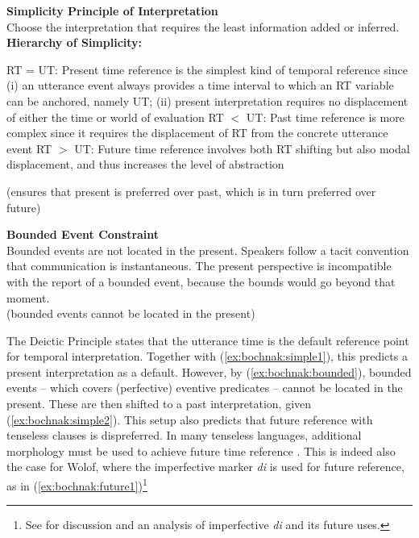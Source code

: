 \documentclass[output=paper]{langsci/langsci}
\begin{document}
\begin{exe}
\ex\label{ex:bochnak:simplicity} \textbf{Simplicity Principle of Interpretation} \\
Choose the interpretation that requires the least information added or
inferred. \smallskip \\
\textbf{Hierarchy of Simplicity:} 
\begin{xlist}
\ex\label{ex:bochnak:simple1} RT = UT: Present time reference is the simplest kind of temporal reference since (i) an utterance event always provides a time interval to which an RT variable can be anchored, namely UT; (ii) present interpretation requires no displacement of either the time or world of evaluation
\ex\label{ex:bochnak:simple2} RT $<$ UT: Past time reference is more complex since it requires the displacement of RT from the concrete utterance event
\ex\label{ex:bochnak:simple3} RT $>$ UT: Future time reference involves both RT shifting but also modal displacement, and thus increases the level of abstraction
\end{xlist}
(ensures that present is preferred over past, which is in turn preferred over future)
\end{exe}

\ea\label{ex:bochnak:bounded} \textbf{Bounded Event Constraint} \\ Bounded events are not located in the present. Speakers follow a tacit convention that communication is instantaneous. The present perspective is incompatible with the report of a bounded event, because the bounds would go beyond that moment. \\
(bounded events cannot be located in the present)
\z

The Deictic Principle states that the utterance time is the default reference point for temporal interpretation. Together with (\ref{ex:bochnak:simple1}), this predicts a present interpretation as a default. However, by (\ref{ex:bochnak:bounded}), bounded events -- which covers (perfective) eventive predicates -- cannot be located in the present. These are then shifted to a past interpretation, given (\ref{ex:bochnak:simple2}). This setup also predicts that future reference with tenseless clauses is dispreferred. In many tenseless languages, additional morphology must be used to achieve future time reference \citep{matthewson06temporal, tonhauser11temporal, bochnak16past}. This is indeed also the case for Wolof, where the imperfective marker \textit{di} is used for future reference, as in (\ref{ex:bochnak:future1})\footnote{See \citealt{bochnak17deriving} for discussion and an analysis of imperfective \textit{di} and its future uses.}
\end{document}
